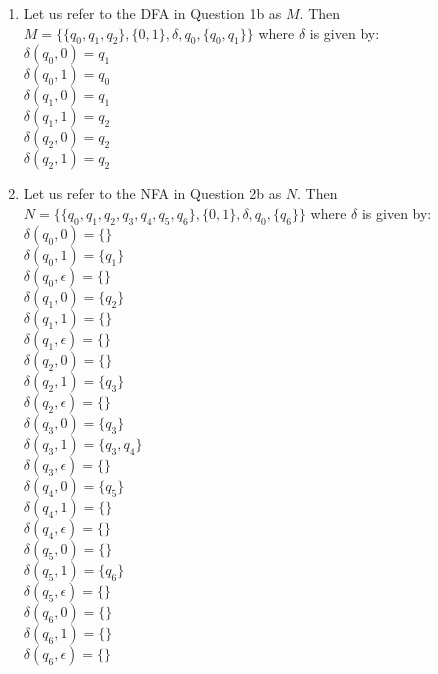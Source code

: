 \documentclass[a4paper, 12pt]{article}
\begin{document}
\begin{enumerate}

\newpage
\item %
Let us refer to the DFA in Question 1b as $M$. Then 
$ M = \{\{q_0, q_1, q_2\}, \{0, 1\}, \delta, q_0, \{q_0, q_1\}\} $
where $ \delta $ is given by:\\
$\delta(q_0, 0) = q_1$\\
$\delta(q_0, 1) = q_0$\\
$\delta(q_1, 0) = q_1$\\
$\delta(q_1, 1) = q_2$\\
$\delta(q_2, 0) = q_2$\\
$\delta(q_2, 1) = q_2$\\
 
\item %
Let us refer to the NFA in Question 2b as $N$. Then 
$ N = \{\{q_0, q_1, q_2, q_3, q_4, q_5, q_6\}, \{0, 1\}, \delta, q_0, \{q_6\}\} $
where $ \delta $ is given by:\\
$\delta(q_0, 0) = \{\}$\\
$\delta(q_0, 1) = \{q_1\}$\\
$\delta(q_0, \epsilon) = \{\}$\\
$\delta(q_1, 0) = \{q_2\}$\\
$\delta(q_1, 1) = \{\}$\\
$\delta(q_1, \epsilon) = \{\}$\\
$\delta(q_2, 0) = \{\}$\\
$\delta(q_2, 1) = \{q_3\}$\\
$\delta(q_2, \epsilon) = \{\}$\\
$\delta(q_3, 0) = \{q_3\}$\\
$\delta(q_3, 1) = \{q_3, q_4\}$\\
$\delta(q_3, \epsilon) = \{\}$\\
$\delta(q_4, 0) = \{q_5\}$\\
$\delta(q_4, 1) = \{\}$\\
$\delta(q_4, \epsilon) = \{\}$\\
$\delta(q_5, 0) = \{\}$\\
$\delta(q_5, 1) = \{q_6\}$\\
$\delta(q_5, \epsilon) = \{\}$\\
$\delta(q_6, 0) = \{\}$\\
$\delta(q_6, 1) = \{\}$\\
$\delta(q_6, \epsilon) = \{\}$\\


\end{enumerate}
\end{document}
